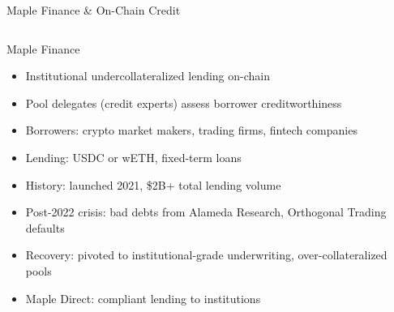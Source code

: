 \documentclass[8pt,aspectratio=169]{beamer}
\begin{document}
\begin{frame}{Maple Finance \& On-Chain Credit}
\begin{columns}[T]
\vspace{2mm}
\footnotesize
\begin{block}{Maple Finance}
\begin{itemize}
  \item Institutional undercollateralized lending on-chain
  \item Pool delegates (credit experts) assess borrower creditworthiness
  \item Borrowers: crypto market makers, trading firms, fintech companies
  \item Lending: USDC or wETH, fixed-term loans
  \item History: launched 2021, \$2B+ total lending volume
  \item Post-2022 crisis: bad debts from Alameda Research, Orthogonal Trading defaults
  \item Recovery: pivoted to institutional-grade underwriting, over-collateralized pools
  \item Maple Direct: compliant lending to institutions
\end{itemize}
\end{block}


\end{columns}
\end{frame}
\end{document}
